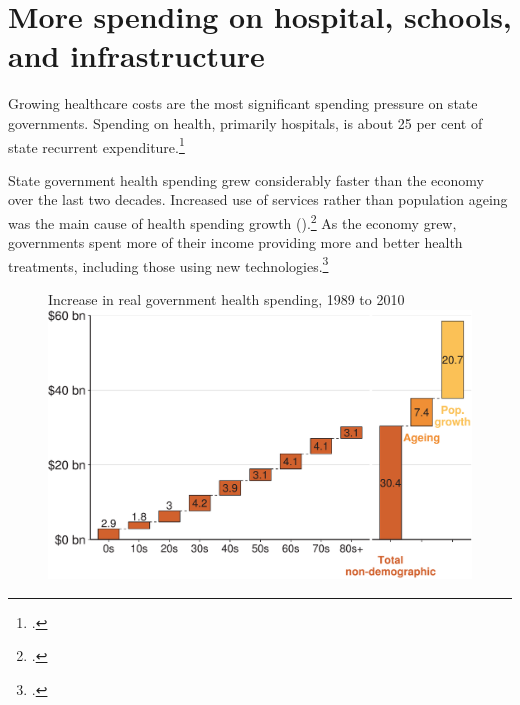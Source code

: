 \documentclass[twoside,english]{grattanBudgetRepairb5portrait}
\begin{document}
\section{More spending on hospital, schools, and infrastructure\label{sec:FISCAL-4-2}}
Growing healthcare costs are the most significant spending pressure on state governments. Spending on health, primarily hospitals, is about 25 per cent of state recurrent expenditure.\footcite[][4]{DaleyMcGannonHunter2014}

State government health spending grew considerably faster than the economy over the last two decades. Increased use of services rather than population ageing was the main cause of health spending growth ().\footcite[][26]{DaleyWoodWeidmannEtAl2014}  As the economy grew, governments spent more of their income providing more and better health treatments, including those using new technologies.\footcite{gruen2007conceptual}

\begin{figure}
%
{Increase in real government health spending, 1989 to 2010}
\includegraphics[width=\columnwidth]{Fiscal-challenges/figure/Figure13-1.pdf}

\end{figure}
\end{document}
